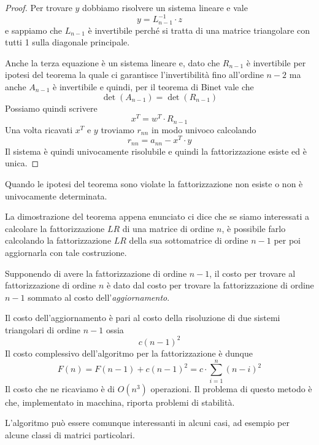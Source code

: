 \begin{theorem}
\begin{proof}
		Per trovare $y$ dobbiamo risolvere un sistema lineare e vale
		\[ y = L_{n-1}^{-1} \cdot z \]
		e sappiamo che $L_{n-1}$ è invertibile perché si tratta di una matrice triangolare con tutti 1 sulla
		diagonale principale.

		Anche la terza equazione è un sistema lineare e, dato che $R_{n-1}$ è invertibile per ipotesi del teorema
		la quale ci garantisce l'invertibilità fino all'ordine $n-2$ ma anche $A_{n-1}$ è invertibile e quindi,
		per il teorema di Binet vale che
		\[ \det(A_{n-1}) = \det(R_{n-1}) \]
		Possiamo quindi scrivere
		\[ x^T = w^T \cdot R_{n-1} \]
		Una volta ricavati $x^T$ e $y$ troviamo $r_{nn}$ in modo univoco calcolando
		\[ r_{nn} = a_{nn} - x^T \cdot y \]
		Il sistema è quindi univocamente risolubile e quindi la fattorizzazione esiste ed è unica.
	\end{proof}
	Quando le ipotesi del teorema sono violate la fattorizzazione non esiste o non è univocamente determinata.
\end{theorem}

La dimostrazione del teorema appena enunciato ci dice che se siamo interessati a calcolare la fattorizzazione
$LR$ di una matrice di ordine $n$, è possibile farlo calcolando la fattorizzazione $LR$ della sua sottomatrice
di ordine $n-1$ per poi aggiornarla con tale costruzione.

Supponendo di avere la fattorizzazione di ordine $n-1$, il costo per trovare al fattorizzazione di ordine $n$
è dato dal costo per trovare la fattorizzazione di ordine $n-1$ sommato al costo dell'\emph{aggiornamento}.

Il costo dell'aggiornamento è pari al costo della risoluzione di due sistemi triangolari di ordine $n-1$ ossia
\[ c (n - 1)^2 \]
Il costo complessivo dell'algoritmo per la fattorizzazione è dunque
\[ F(n) = F(n-1) + c (n-1)^2 = c \cdot \sum_{i=1}^{n} (n - i)^2 \]
Il costo che ne ricaviamo è di $O(n^3)$ operazioni. Il problema di questo metodo è che, implementato in macchina,
riporta problemi di stabilità.

L'algoritmo può essere comunque interessanti in alcuni casi, ad esempio per alcune classi di matrici particolari.

